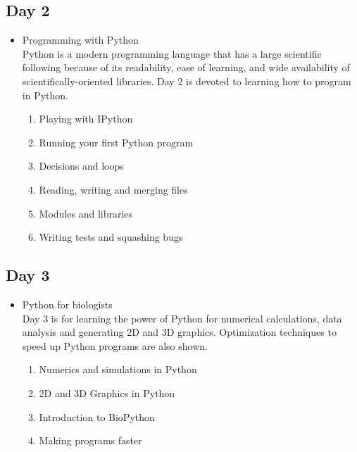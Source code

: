 \documentclass[11pt,letter]{article}
\begin{document}
\subsection{Day 2}
\label{sec-1-2}
\begin{itemize}

\item Programming with Python\\
\label{sec-1-2-1}%
Python is a modern programming language that has a large scientific following because of its readability, ease of learning, and wide availability of scientifically-oriented libraries. Day 2 is devoted to learning how to program in Python.
\begin{enumerate}
\item Playing with IPython
\item Running your first Python program
\item Decisions and loops
\item Reading, writing and merging files
\item Modules and libraries
\item Writing tests and squashing bugs
\end{enumerate}
\end{itemize} %
\subsection{Day 3}
\label{sec-1-3}
\begin{itemize}

\item Python for biologists\\
\label{sec-1-3-1}%
Day 3 is for learning the power of Python for numerical calculations, data analysis and generating 2D and 3D graphics. Optimization techniques to speed up Python programs are also shown.
\begin{enumerate}
\item Numerics and simulations in Python
\item 2D and 3D Graphics in Python
\item Introduction to BioPython
\item Making programs faster
\end{enumerate}
\end{itemize} %
\end{document}

